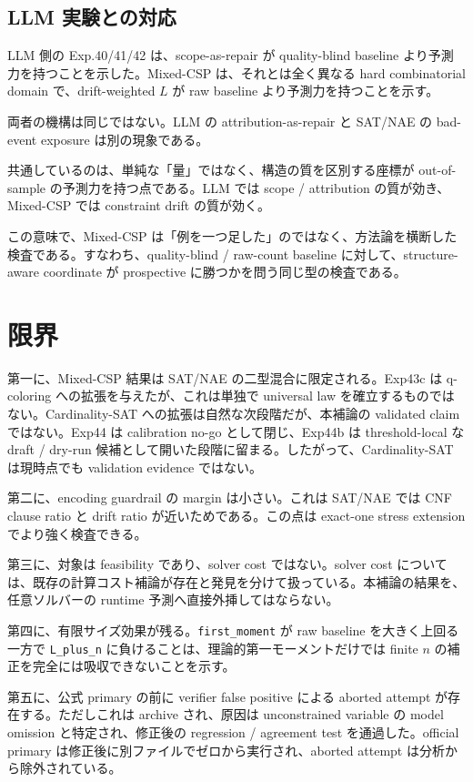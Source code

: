 \documentclass[12pt,a4paper]{article}
\begin{document}
\subsection{LLM 実験との対応}\label{llm-ux5b9fux9a13ux3068ux306eux5bfeux5fdc}

LLM 側の Exp.40/41/42 は、scope-as-repair が quality-blind baseline より予測力を持つことを示した。Mixed-CSP は、それとは全く異なる hard combinatorial domain で、drift-weighted \(L\) が raw baseline より予測力を持つことを示す。

両者の機構は同じではない。LLM の attribution-as-repair と SAT/NAE の bad-event exposure は別の現象である。

共通しているのは、単純な「量」ではなく、構造の質を区別する座標が out-of-sample の予測力を持つ点である。LLM では scope / attribution の質が効き、Mixed-CSP では constraint drift の質が効く。

この意味で、Mixed-CSP は「例を一つ足した」のではなく、方法論を横断した検査である。すなわち、quality-blind / raw-count baseline に対して、structure-aware coordinate が prospective に勝つかを問う同じ型の検査である。

\section{限界}\label{ux9650ux754c}

第一に、Mixed-CSP 結果は SAT/NAE の二型混合に限定される。Exp43c は q-coloring への拡張を与えたが、これは単独で universal law を確立するものではない。Cardinality-SAT への拡張は自然な次段階だが、本補論の validated claim ではない。Exp44 は calibration no-go として閉じ、Exp44b は threshold-local な draft / dry-run 候補として開いた段階に留まる。したがって、Cardinality-SAT は現時点でも validation evidence ではない。

第二に、encoding guardrail の margin は小さい。これは SAT/NAE では CNF clause ratio と drift ratio が近いためである。この点は exact-one stress extension でより強く検査できる。

第三に、対象は feasibility であり、solver cost ではない。solver cost については、既存の計算コスト補論が存在と発見を分けて扱っている。本補論の結果を、任意ソルバーの runtime 予測へ直接外挿してはならない。

第四に、有限サイズ効果が残る。\texttt{first\_moment} が raw baseline を大きく上回る一方で \texttt{L\_plus\_n} に負けることは、理論的第一モーメントだけでは finite \(n\) の補正を完全には吸収できないことを示す。

第五に、公式 primary の前に verifier false positive による aborted attempt が存在する。ただしこれは archive され、原因は unconstrained variable の model omission と特定され、修正後の regression / agreement test を通過した。official primary は修正後に別ファイルでゼロから実行され、aborted attempt は分析から除外されている。
\end{document}
